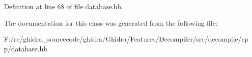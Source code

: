 Definition at line 68 of file database.\+hh.



The documentation for this class was generated from the following file\+:\begin{DoxyCompactItemize}
\item 
F\+:/re/ghidra\+\_\+sourcecode/ghidra/\+Ghidra/\+Features/\+Decompiler/src/decompile/cpp/\mbox{\hyperlink{database_8hh}{database.\+hh}}\end{DoxyCompactItemize}
